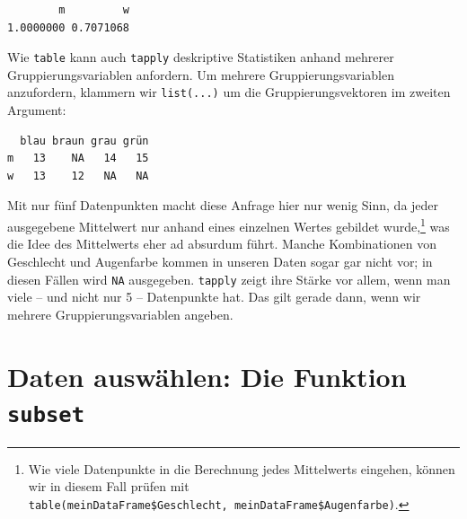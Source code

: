 \documentclass[12pt,]{tufte-book}
\newenvironment{Shaded}{\begin{snugshade}}{\end{snugshade}}
\newcommand{\KeywordTok}[1]{\textcolor[rgb]{0.13,0.29,0.53}{\textbf{#1}}}
\newcommand{\OperatorTok}[1]{\textcolor[rgb]{0.81,0.36,0.00}{\textbf{#1}}}
\newcommand{\NormalTok}[1]{#1}
\theoremstyle{definition}
\theoremstyle{definition}
\theoremstyle{definition}
\theoremstyle{remark}
\begin{document}
\begin{Shaded}
\end{Shaded}

\begin{verbatim}
        m         w 
1.0000000 0.7071068 
\end{verbatim}

Wie \texttt{table} kann auch \texttt{tapply} deskriptive Statistiken
anhand mehrerer Gruppierungsvariablen anfordern. Um mehrere
Gruppierungsvariablen anzufordern, klammern wir \texttt{list(...)} um
die Gruppierungsvektoren im zweiten Argument:

\begin{Shaded}
\end{Shaded}

\begin{verbatim}
  blau braun grau grün
m   13    NA   14   15
w   13    12   NA   NA
\end{verbatim}

Mit nur fünf Datenpunkten macht diese Anfrage hier nur wenig Sinn, da
jeder ausgegebene Mittelwert nur anhand eines einzelnen Wertes gebildet
wurde,\footnote{Wie viele Datenpunkte in die Berechnung jedes
  Mittelwerts eingehen, können wir in diesem Fall prüfen mit
  \texttt{table(meinDataFrame\$Geschlecht,\ meinDataFrame\$Augenfarbe)}.}
was die Idee des Mittelwerts eher ad absurdum führt. Manche
Kombinationen von Geschlecht und Augenfarbe kommen in unseren Daten
sogar gar nicht vor; in diesen Fällen wird \texttt{NA} ausgegeben.
\texttt{tapply} zeigt ihre Stärke vor allem, wenn man viele -- und nicht
nur 5 -- Datenpunkte hat. Das gilt gerade dann, wenn wir mehrere
Gruppierungsvariablen angeben.

\hypertarget{subset}{\section{\texorpdfstring{Daten auswählen: Die
Funktion
\texttt{subset}}{Daten auswählen: Die Funktion subset}}\label{subset}}
\end{document}
